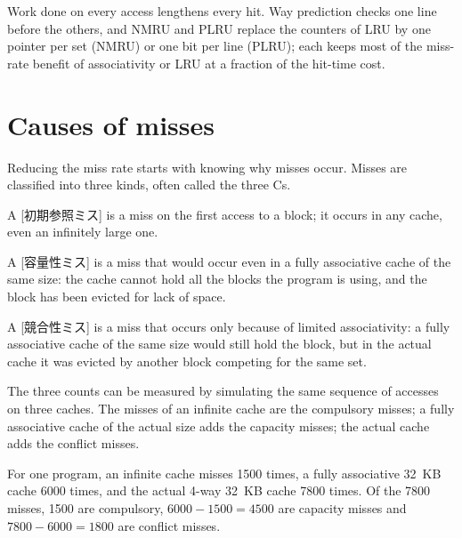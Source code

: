 \documentclass[../main.tex]{subfiles}
\begin{document}
\begin{keypoint}
  Work done on every access lengthens every hit.  Way prediction checks one
  line before the others, and NMRU and PLRU replace the counters of LRU by one
  pointer per set (NMRU) or one bit per line (PLRU); each keeps most of the
  miss-rate benefit of associativity or LRU at a fraction of the hit-time
  cost.
\end{keypoint}

\section{Causes of misses}
\label{sec:l14-three-cs}

Reducing the miss rate starts with knowing why misses
occur.  Misses are
classified into three kinds, often called the three Cs.

\begin{definition}
  A [初期参照ミス] is a miss on the first access to a
  block; it occurs in any cache, even an infinitely large one.

  A [容量性ミス] is a miss that would occur even in a
  fully associative cache of the same size: the cache cannot hold all the
  blocks the program is using, and the block has been evicted for lack of
  space.

  A [競合性ミス] is a miss that occurs only because of
  limited associativity: a fully associative cache of the same size would
  still hold the block, but in the actual cache it was evicted by another
  block competing for the same set.
\end{definition}

The three counts can be measured by simulating the same sequence of accesses
on three caches.  The misses of an infinite cache are the compulsory misses;
a fully associative cache of the actual size adds the capacity misses; the
actual cache adds the conflict misses.

\begin{example}
  \label{ex:l14-three-cs}
  For one program, an infinite cache misses \num{1500} times, a fully
  associative 32~KB cache \num{6000} times, and the actual 4-way 32~KB cache
  \num{7800} times.  Of the \num{7800} misses, \num{1500} are compulsory,
  $\num{6000} - \num{1500} = \num{4500}$ are capacity misses and
  $\num{7800} - \num{6000} = \num{1800}$ are conflict misses.
\end{example}
\end{document}
